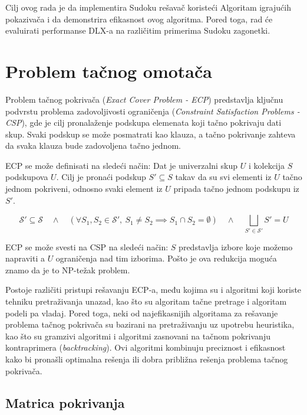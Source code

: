 \documentclass[a4paper]{article}
\begin{document}
{Cilj ovog rada je da implementira Sudoku rešavač koristeći Algoritam igrajućih pokazivača i da
demonstrira efikasnost ovog algoritma. Pored toga, rad će evaluirati performanse DLX-a na
različitim primerima Sudoku zagonetki.

\section{Problem tačnog omotača}

Problem tačnog pokrivača ({\em Exact Cover Problem - ECP}) predstavlja ključnu podvrstu problema
zadovoljivosti ograničenja ({\em Constraint Satisfaction Problems - CSP}), gde je cilj
pronalaženje podskupa elemenata koji tačno pokrivaju dati skup. Svaki podskup se može posmatrati
kao klauza, a tačno pokrivanje zahteva da svaka klauza bude zadovoljena tačno jednom.

ECP se može definisati na sledeći način: Dat je univerzalni skup \( U \)
i kolekcija \( S \) podskupova \( U \). Cilj je pronaći podskup \( S' \subseteq S \) takav
da su svi elementi iz \( U \) tačno jednom pokriveni, odnosno svaki element iz \( U \) pripada
tačno jednom podskupu iz \( S' \).

\[
\mathcal{S}' \subseteq \mathcal{S} \quad \wedge \quad \left( \forall S_1, S_2 \in \mathcal{S}', \ S_1 \neq S_2 \implies S_1 \cap S_2 = \emptyset \right) \quad \wedge \quad \bigsqcup_{S' \in \mathcal{S}'} S' = U
\]

ECP se može svesti na CSP \cite{reduction} na sledeći način: \( S \) predstavlja izbore koje možemo
napraviti a \( U \) ograničenja nad tim izborima. Pošto je ova redukcija moguća  znamo da je to NP-težak problem.

Postoje različiti pristupi rešavanju ECP-a, među kojima su i algoritmi koji koriste tehniku pretraživanja
unazad, kao što su algoritam tačne pretrage i algoritam podeli pa vladaj. Pored toga, neki od najefikasnijih
algoritama za rešavanje problema tačnog pokrivača su bazirani na pretraživanju uz upotrebu heuristika, kao
što su gramzivi algoritmi i algoritmi zasnovani na tačnom pokrivanju kontraprimera ({\em backtracking}).
Ovi algoritmi kombinuju preciznost i efikasnost kako bi pronašli optimalna rešenja ili dobra približna rešenja
problema tačnog pokrivača.

\subsection{Matrica pokrivanja}

}
\end{document}
